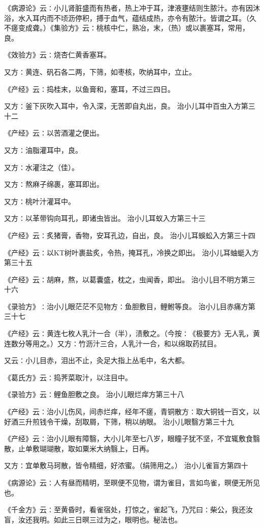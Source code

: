 \documentclass[a4paper,12pt,UTF8,twoside]{ctexbook}
\begin{document}
《病源论》云∶小儿肾脏盛而有热者，热上冲于耳，津液壅结则生脓汁。亦有因沐浴，水入耳内而不顷沥停积，搏于血气，蕴结成热，亦令有脓汁。皆谓之耳。（久不瘥变成聋。）《集验方》云∶桃核中仁，熟冶，末，（热）或以裹塞耳，常用，良。

《效验方》云∶烧杏仁黄香塞耳。

又方∶黄连、矾石各二两，下筛，如枣核，吹纳耳中，立止。

《产经》云∶捣桂末，以鱼膏和，塞耳，不过三四日。

又方∶釜下灰吹入耳中，令入深，无苦即自丸出，良。
治小儿耳中百虫入方第三十二

《产经》云∶以苦酒灌之便出。

又方∶油脂灌耳中，良。

又方∶水灌注之（佳）。

又方∶熬麻子绵裹，塞耳即出。

又方∶桃叶汁灌耳中。

又方∶以革带钩向耳孔，即诸虫皆出。
治小儿耳蚁入方第三十三

《产经》云∶炙猪膏，香物，安耳孔边，自出，良。
治小儿耳蜈蚣入方第三十四

《产经》云∶以KT树叶裹盐炙，令热，掩耳孔，冷换之即出。
治小儿耳蚰蜓入方第三十五

《产经》云∶胡麻，熬，以葛囊盛，枕之，虫闻香，即出。
治小儿目不明方第三十六

《录验方》∶治小儿眼茫茫不见物方∶鱼胆敷目，鲤鲋等良。
治小儿目赤痛方第三十七

《产经》云∶黄连七枚人乳汁一合（半），渍敷之。（今按∶《极要方》无人乳，黄连数分等用之。）又方∶竹沥汁三合，人乳汁一合，和以绵取药拭目。

又云∶小儿目赤，泪出不止，灸足大指上丛毛中，名大都。

《葛氏方》云∶捣荠菜取汁，以注目中。

《录验方》云∶鲤鱼胆敷之良。
治小儿眼烂痒方第三十八

《产经》云∶治小儿伤风，间赤烂痒，经年不瘥，青铜散方∶取大铜钱一百文，以好酒三升煎钱令干燥，刮取屑，下筛，稍以纳眼。
治小儿眼翳方第三十九

《产经》云∶治小儿眼有障翳，大小儿年至七八岁，眼瞳子犹不坚，不宜辄敷食翳散，止单敷瑚瑚散，取如粟米大纳翳上，日再。

又方∶宜单敷马珂散，皆令精细，好浓蜜。（绢筛用之。）
治小儿雀盲方第四十

《病源论》云∶人有昼而精明，至暝便不见物，谓为雀目，言如鸟雀，暝便无所见也。

《千金方》云∶至黄昏时，看雀宿处，打惊之，雀起飞，乃咒曰∶柴公，我还汝盲，汝还我明。如此三日暝三过为之，眼明也。秘法也。
\end{document}
